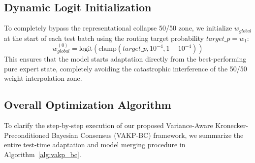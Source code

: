 \documentclass{article}
\theoremstyle{plain}
\theoremstyle{definition}
\theoremstyle{remark}
\begin{document}
\subsection{Dynamic Logit Initialization}
To completely bypass the representational collapse 50/50 zone, we initialize $w_{global}$ at the start of each test batch using the routing target probability $target\_p = w_1$:
\begin{equation}
    w_{global}^{(0)} = \text{logit}(\text{clamp}(target\_p, 10^{-4}, 1 - 10^{-4}))
\end{equation}
This ensures that the model starts adaptation directly from the best-performing pure expert state, completely avoiding the catastrophic interference of the 50/50 weight interpolation zone.

\subsection{Overall Optimization Algorithm}
To clarify the step-by-step execution of our proposed Variance-Aware Kronecker-Preconditioned Bayesian Consensus (VAKP-BC) framework, we summarize the entire test-time adaptation and model merging procedure in Algorithm~\ref{alg:vakp_bc}.
\end{document}
